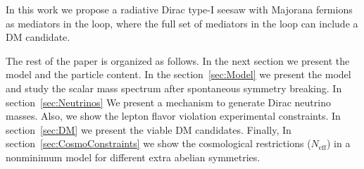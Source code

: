 \documentclass[12pt]{article}
\begin{document}
In this work we propose a radiative Dirac type-I seesaw with Majorana
fermions as mediators in the loop, where the full set of mediators in the
loop can include a DM candidate.

The rest of the paper is organized as follows. In the next section we present the model and the particle content. In the section~\ref{sec:Model} we present the model and study the scalar mass spectrum after spontaneous symmetry breaking. In section~\ref{sec:Neutrinos} We present a mechanism to generate Dirac neutrino masses. Also, we show the lepton flavor violation experimental  constraints. In section~\ref{sec:DM} we present the viable DM candidates. Finally, In section~\ref{sec:CosmoConstraints} we show the cosmological restrictions ($N_{\text{eff}}$) in a nonminimum model for different extra abelian symmetries.
\end{document}
